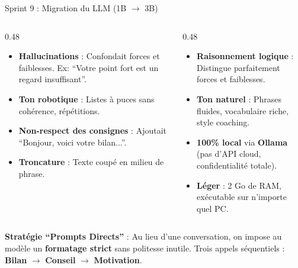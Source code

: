 \documentclass[10pt,aspectratio=169]{beamer}
\newcommand{\cmark}{\textcolor{success}{\ding{51}}}%
\newcommand{\xmark}{\textcolor{danger}{\ding{55}}}%
\begin{document}
\begin{frame}{Sprint 9 : Migration du LLM (1B $\rightarrow$ 3B)}
    \begin{columns}[T]
        \begin{column}{0.48\textwidth}
            \begin{tcolorbox}[title=\xmark~Llama 3.2 1B (Abandonné), colframe=danger, colback=danger!3]
                \footnotesize
                \begin{itemize}
                    \item \textbf{Hallucinations} : Confondait forces et faiblesses. Ex: ``Votre point fort est un regard insuffisant''.
                    \item \textbf{Ton robotique} : Listes à puces sans cohérence, répétitions.
                    \item \textbf{Non-respect des consignes} : Ajoutait ``Bonjour, voici votre bilan...''.
                    \item \textbf{Troncature} : Texte coupé en milieu de phrase.
                \end{itemize}
            \end{tcolorbox}
        \end{column}
        \begin{column}{0.48\textwidth}
            \begin{tcolorbox}[title=\cmark~Llama 3.2 3B (Version Finale), colframe=success, colback=success!3]
                \footnotesize
                \begin{itemize}
                    \item \textbf{Raisonnement logique} : Distingue parfaitement forces et faiblesses.
                    \item \textbf{Ton naturel} : Phrases fluides, vocabulaire riche, style coaching.
                    \item \textbf{100\% local} via \textbf{Ollama} (pas d'API cloud, confidentialité totale).
                    \item \textbf{Léger} : 2 Go de RAM, exécutable sur n'importe quel PC.
                \end{itemize}
            \end{tcolorbox}
        \end{column}
    \end{columns}
    \vspace{0.3cm}
    \begin{tcolorbox}[colback=secondary, colframe=primary!30]
        \centering \small
        \textbf{Stratégie ``Prompts Directs''} : Au lieu d'une conversation, on impose au modèle un \textbf{formatage strict} sans politesse inutile. Trois appels séquentiels : \textbf{Bilan} $\rightarrow$ \textbf{Conseil} $\rightarrow$ \textbf{Motivation}.
    \end{tcolorbox}
\end{frame}
\end{document}
